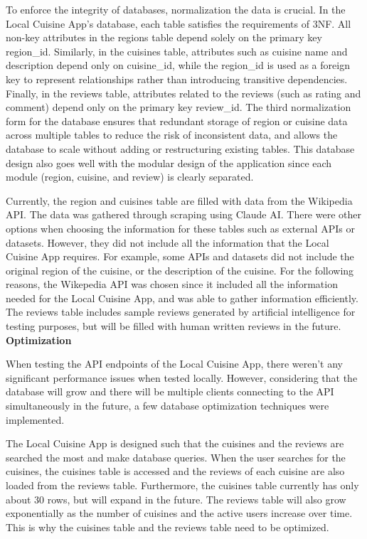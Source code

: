 To enforce the integrity of databases, normalization the data is crucial.
In the Local Cuisine App's database, each table satisfies the requirements of 3NF.
All non-key attributes in the regions table depend solely on the primary key region\_id.
Similarly, in the cuisines table, attributes such as cuisine name and description depend only on cuisine\_id,
while the region\_id is used as a foreign key to represent relationships rather than introducing transitive dependencies.
Finally, in the reviews table, attributes related to the reviews (such as rating and comment) depend only on the primary key review\_id.
The third normalization form for the database ensures that redundant storage of
region or cuisine data across multiple tables to reduce the risk of inconsistent data, and allows the database to scale without adding or 
restructuring existing tables. This database design also goes well with the modular design of the application
since each module (region, cuisine, and review) is clearly separated.

Currently, the region and cuisines table are filled with data from the Wikipedia API. The data was gathered through scraping using Claude AI.
There were other options when choosing the information for these tables such as external APIs or datasets. However, they did not include all the information
that the Local Cuisine App requires. For example, some APIs and datasets did not include the original region of the cuisine, or the description of the cuisine.
For the following reasons, the Wikepedia API was chosen since it included all the information needed for the Local Cuisine App, and was able to gather information
efficiently.
The reviews table includes sample reviews generated by artificial intelligence for testing purposes, but will be filled with human written reviews in the future. \\


\noindent \textbf{Optimization}

When testing the API endpoints of the Local Cuisine App, there weren't any significant performance issues when 
tested locally. However, considering that the database will grow and there will be multiple clients connecting to the API 
simultaneously in the future, a few database optimization techniques were implemented. 

The Local Cuisine App is designed such that the cuisines and the reviews are searched the most and make database queries.
When the user searches for the cuisines, the cuisines table is accessed and the reviews of each cuisine are also loaded from 
the reviews table. Furthermore, the cuisines table currently has only about 30 rows, but will expand in the future.
The reviews table will also grow exponentially as the number of cuisines and the active users increase over time.
This is why the cuisines table and the reviews table need to be optimized.

